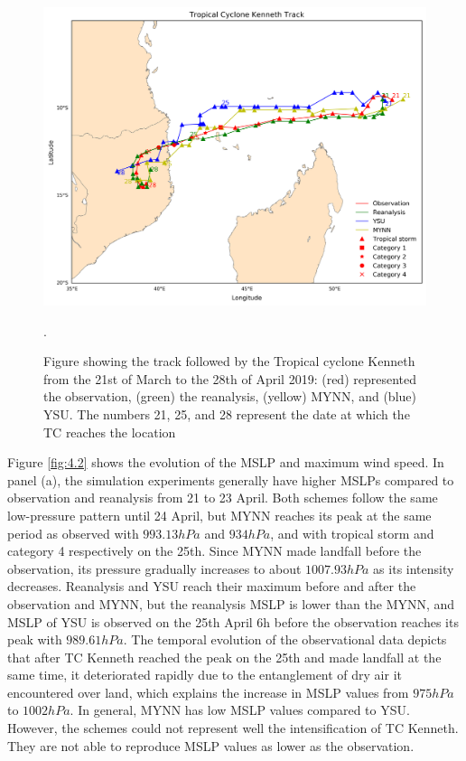 \documentclass[8pt,a4paper]{article}
\begin{document}
	
	\begin{figure}[H]
		\centering 
		\includegraphics[width = 12cm]{N/K_track_HDN}
		\caption{Figure showing the track followed by the Tropical cyclone Kenneth from the 21st of March to the 28th of April 2019: (red) represented the observation, (green) the reanalysis, (yellow) MYNN, and (blue) YSU. The numbers 21, 25, and 28 represent the date at which the TC reaches the location }.
		\label{fig:4.1}
	\end{figure}
	
	Figure \ref{fig:4.2} shows the evolution of the MSLP and maximum wind speed. In panel (a), the simulation experiments generally have higher MSLPs compared to observation and reanalysis from 21 to 23 April. 
	Both schemes follow the same low-pressure pattern until 24 April, but MYNN reaches its peak at the same period as observed with $993.13 hPa$ and $934 hPa$, and with tropical storm and category 4 respectively on the 25th. Since MYNN made landfall before the observation, its pressure gradually increases to about $1007.93 hPa$ as its intensity decreases. Reanalysis and YSU reach their maximum before and after the observation and MYNN, but the reanalysis MSLP is lower than the MYNN, and MSLP of YSU is observed on the 25th April 6h before the observation reaches its peak with $989.61 hPa$.
	The temporal evolution of the observational data depicts that after TC Kenneth reached the peak on the 25th and made landfall at the same time, it deteriorated rapidly due to the entanglement of dry air it encountered over land, which explains the increase in MSLP values from $975 hPa$ to $1002 hPa$. In general, MYNN has low MSLP values compared to YSU. However, the schemes could not represent well the intensification of TC Kenneth. They are not able to reproduce MSLP values as lower as the observation.
	
\end{document}
